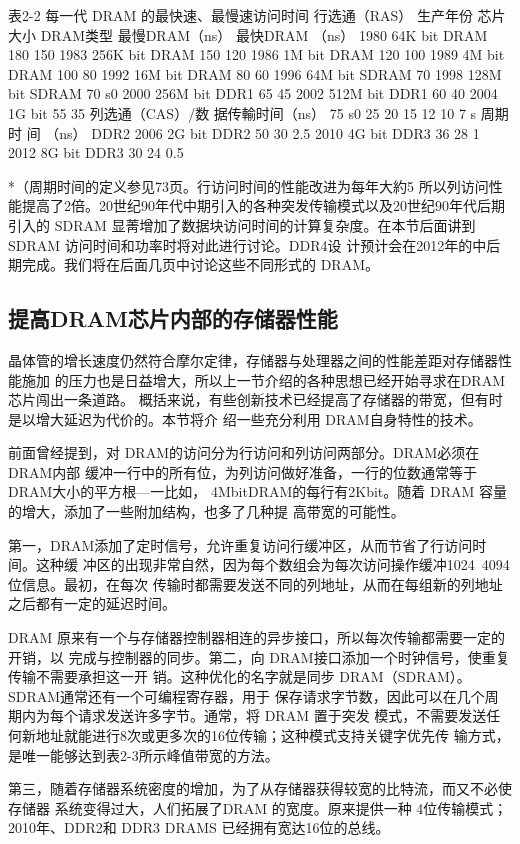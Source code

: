 表2-2 每一代 DRAM 的最快速、最慢速访问时间
行选通（RAS）
生产年份
芯片大小
DRAM类型
最慢DRAM（ns） 最快DRAM （ns）
1980
64K bit
DRAM
180
150
1983
256K bit
DRAM
150
120
1986
1M bit
DRAM
120
100
1989
4M bit
DRAM
100
80
1992
16M bit
DRAM
80
60
1996
64M bit
SDRAM
70
1998
128M bit
SDRAM
70
s0
2000
256M bit
DDR1
65
45
2002
512M bit
DDR1
60
40
2004
1G bit
55
35
列选通（CAS）/数
据传輸时间（ns）
75
s0
25
20
15
12
10
7
s
周期时
间 （ns）
DDR2
2006
2G bit
DDR2
50
30
2.5
2010
4G bit
DDR3
36
28
1
2012
8G bit
DDR3
30
24
0.5

*（周期时间的定义参见73页。行访问时间的性能改进为每年大約5%
所以列访问性能提高了2倍。20世纪90年代中期引入的各种突发传输模式以及20世纪90年代后期引入的 SDRAM
显菁增加了数据块访问时间的计算复杂度。在本节后面讲到 SDRAM 访问时间和功率时将对此进行讨论。DDR4设
计预计会在2012年的中后期完成。我们将在后面几页中讨论这些不同形式的 DRAM。

\subsection{提高DRAM芯片内部的存储器性能}
晶体管的增长速度仍然符合摩尔定律，存储器与处理器之间的性能差距对存储器性能施加
的压力也是日益增大，所以上一节介绍的各种思想已经开始寻求在DRAM芯片闯出一条道路。
概括来说，有些创新技术已经提高了存储器的带宽，但有时是以增大延迟为代价的。本节将介
绍一些充分利用 DRAM自身特性的技术。

前面曾经提到，对 DRAM的访问分为行访问和列访问两部分。DRAM必须在 DRAM内部
缓冲一行中的所有位，为列访问做好准备，一行的位数通常等于 DRAM大小的平方根—一比如，
4MbitDRAM的每行有2Kbit。随着 DRAM 容量的增大，添加了一些附加结构，也多了几种提
高带宽的可能性。

第一，DRAM添加了定时信号，允许重复访问行缓冲区，从而节省了行访问时间。这种缓
冲区的出现非常自然，因为每个数组会为每次访问操作缓冲1024~4094位信息。最初，在每次
传输时都需要发送不同的列地址，从而在每组新的列地址之后都有一定的延迟时间。

DRAM 原来有一个与存储器控制器相连的异步接口，所以每次传输都需要一定的开销，以
完成与控制器的同步。第二，向 DRAM接口添加一个时钟信号，使重复传输不需要承担这一开
销。这种优化的名字就是同步 DRAM（SDRAM）。SDRAM通常还有一个可编程寄存器，用于
保存请求字节数，因此可以在几个周期内为每个请求发送许多字节。通常，将 DRAM 置于突发
模式，不需要发送任何新地址就能进行8次或更多次的16位传输；这种模式支持关键字优先传
输方式，是唯一能够达到表2-3所示峰值带宽的方法。

第三，随着存储器系统密度的增加，为了从存储器获得较宽的比特流，而又不必使存储器
系统变得过大，人们拓展了DRAM 的宽度。原来提供一种 4位传输模式；2010年、DDR2和
DDR3 DRAMS 已经拥有宽达16位的总线。

